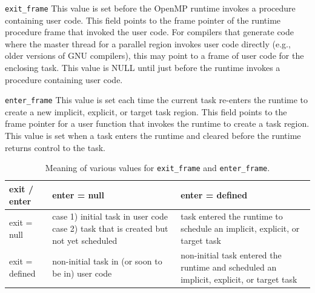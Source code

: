 \documentclass{article}
\begin{document}
\begin{description}
\item \lstinline|exit_frame|
     This value is set before the OpenMP runtime invokes a procedure containing user code. 
     This field points to the frame pointer of the runtime procedure frame that invoked the user code. 
     For compilers that generate code where the master thread for a parallel region invokes user code directly (e.g., older versions of GNU compilers), 
     this may point to a frame of user code for the enclosing task.
     This value is NULL until just before the runtime invokes a procedure containing user code. 

\item \lstinline|enter_frame|
     This value is set each time the current task re-enters the 
     runtime to create a new implicit, explicit, or target task region. This field 
     points to the frame pointer for a user function that invokes the runtime to create a task region.  
     This value is set when a task enters the runtime and cleared before the runtime returns control to the task.

\end{description}



\begin{table}
\begin{center}
\begin{tabular}{|l|p{2in}|p{2in}|}
\hline
exit / enter 	& enter = null										& enter = defined \\\hline\hline
exit = null		& case 1)  initial task in user code case 2) task that is created but not yet scheduled &  task entered the runtime to schedule an implicit, explicit, or target task \\\hline
exit = defined 	& non-initial task in (or soon to be in) user code							& non-initial task entered the runtime and scheduled an implicit, explicit, or target task\\\hline
\end{tabular}
\end{center}
\caption{Meaning of various values for {\tt exit\_frame} and {\tt enter\_frame}.}
\label{tab:frame}
\end{table}
\end{document}
